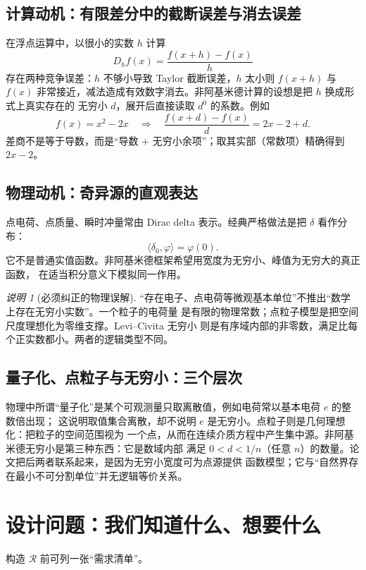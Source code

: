 \documentclass[11pt,a4paper]{article}
\theoremstyle{remark}
\newtheorem{remark}[definition]{说明}
\newcommand{\LC}{\mathcal R}
\begin{document}
\subsection{计算动机：有限差分中的截断误差与消去误差}

在浮点运算中，以很小的实数 $h$ 计算
\[
D_hf(x)=\frac{f(x+h)-f(x)}h
\]
存在两种竞争误差：$h$ 不够小导致 Taylor 截断误差，$h$ 太小则 $f(x+h)$ 与 $f(x)$
非常接近，减法造成有效数字消去。非阿基米德计算的设想是把 $h$ 换成形式上真实存在的
无穷小 $d$，展开后直接读取 $d^0$ 的系数。例如
\[
f(x)=x^2-2x
\quad\Longrightarrow\quad
\frac{f(x+d)-f(x)}d=2x-2+d.
\]
差商不是等于导数，而是“导数 $+$ 无穷小余项”；取其实部（常数项）精确得到 $2x-2$。

\subsection{物理动机：奇异源的直观表达}

点电荷、点质量、瞬时冲量常由 Dirac delta 表示。经典严格做法是把 $\delta$ 看作分布：
\[
\langle\delta_0,\varphi\rangle=\varphi(0).
\]
它不是普通实值函数。非阿基米德框架希望用宽度为无穷小、峰值为无穷大的真正函数，
在适当积分意义下模拟同一作用。

\begin{remark}[必须纠正的物理误解]
“存在电子、点电荷等微观基本单位”不推出“数学上存在无穷小实数”。一个粒子的电荷量
是有限的物理常数；点粒子模型是把空间尺度理想化为零维支撑。Levi--Civita 无穷小
则是有序域内部的非零数，满足比每个正实数都小。两者的逻辑类型不同。
\end{remark}

\subsection{量子化、点粒子与无穷小：三个层次}

物理中所谓“量子化”是某个可观测量只取离散值，例如电荷常以基本电荷 $e$ 的整数倍出现；
这说明取值集合离散，却不说明 $e$ 是无穷小。点粒子则是几何理想化：把粒子的空间范围视为
一个点，从而在连续介质方程中产生集中源。非阿基米德无穷小是第三种东西：它是数域内部
满足 $0<d<1/n$（任意 $n$）的数量。论文把后两者联系起来，是因为无穷小宽度可为点源提供
函数模型；它与“自然界存在最小不可分割单位”并无逻辑等价关系。

\section{设计问题：我们知道什么、想要什么}

构造 $\LC$ 前可列一张“需求清单”。
\end{document}
